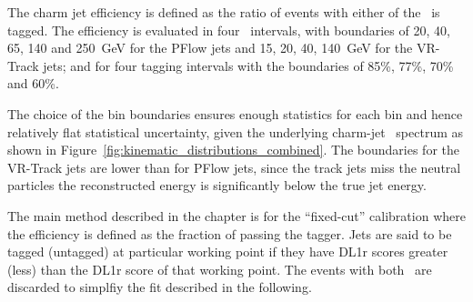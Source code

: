 The charm jet efficiency is defined as the ratio of events with either of the 
\wjet\ is tagged. The efficiency is evaluated in four \pt\ intervals, with 
boundaries of 20, 40, 65, 140 and 250~GeV for the PFlow jets and 15, 20, 40, 140~GeV
for the VR-Track jets; and for four tagging intervals with the boundaries of 85\%, 77\%,
70\% and 60\%. 

The choice of the bin boundaries ensures enough statistics for each bin and 
hence relatively flat statistical uncertainty, 
given the underlying charm-jet \pt\ spectrum as shown in Figure~\ref{fig:kinematic_distributions_combined}.
The boundaries for the VR-Track jets are lower than for PFlow jets, 
since the track jets miss the neutral particles the
reconstructed energy is significantly below the true jet energy.

The main method described in the chapter is for the ``fixed-cut'' calibration
where the efficiency is defined as the fraction of \bjets passing the tagger.
Jets are said to be tagged (untagged) at particular working point
if they have DL1r scores greater (less) than the DL1r score of that working point.
The events with both \wjet\ are discarded to simplfiy the fit described in the following.

